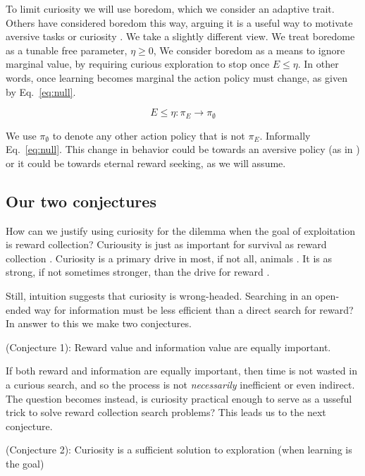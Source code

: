To limit curiosity we will use boredom, which we consider an adaptive trait. Others have considered boredom this way, arguing it is a useful way to motivate aversive tasks \citep{Bench2013} or curiosity \cite{Loewenstein1994}. We take a slightly different view. We treat boredome as a tunable free parameter, $\eta \ge 0$, We consider boredom as a means to ignore marginal value, by requiring curious exploration to stop once $E \le \eta$. In other words, once learning becomes marginal the action policy must change, as given by Eq.~\ref{eq:null}. 

\begin{equation}
	\label{eq:null}
	E \le \eta : \pi_E \rightarrow \pi_{\emptyset}
\end{equation}

We use $\pi_{\emptyset}$ to denote any other action policy that is not $\pi_E$. Informally Eq.~\ref{eq:null}. This change in behavior could be towards an aversive policy (as in \citep{Bench2013}) or it could be towards eternal reward seeking, as we will assume.

\subsection{Our two conjectures}
How can we justify using curiosity for the dilemma when the goal of exploitation is reward collection? Curiousity is just as important for survival as reward collection \cite{Thrun1992}. Curiosity is a primary drive in most, if not all, animals \cite{Inglis2001}. It is as strong, if not sometimes stronger, than the drive for reward \cite{Loewenstein1994,Kidd2015,Gottlieb2018}. 

Still, intuition suggests that curiosity is wrong-headed. Searching in an open-ended way for information must be less efficient than a direct search for reward? In answer to this we make two conjectures.

 (Conjecture 1): Reward value and information value are equally important.

If both reward and information are equally important, then time is not wasted in a curious search, and so the process is not \textit{necessarily} inefficient or even indirect. The question becomes instead, is curiosity practical enough to serve as a usseful trick to solve reward collection search problems? This leads us to the next conjecture. 

 (Conjecture 2): Curiosity is a sufficient solution to exploration (when learning is the goal)

